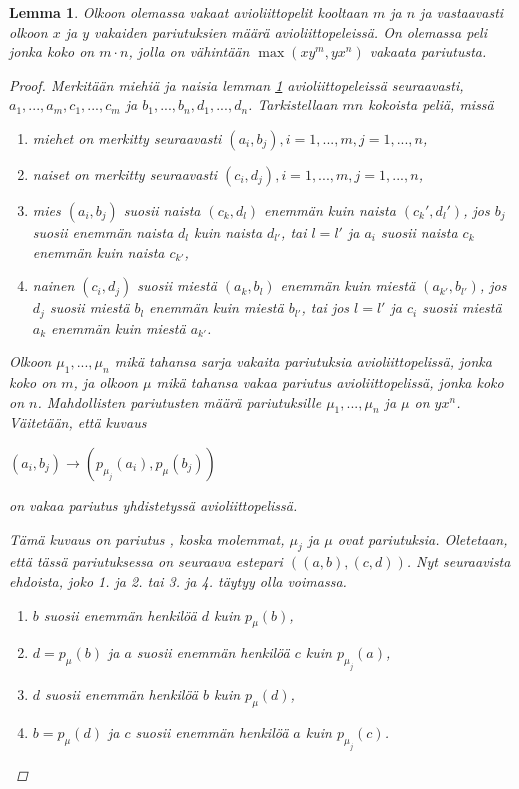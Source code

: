 \documentclass[finnish]{tktltiki2}
\newtheorem{lem}[lau]{Lemma}
\theoremstyle{definition}
\theoremstyle{remark}
\begin{document}
\begin{lem} \cite[s. 23]{gusfield1989stable} \label{lemma-koko}
Olkoon olemassa vakaat avioliittopelit kooltaan $m$ ja $n$ ja vastaavasti olkoon $x$ ja $y$ vakaiden pariutuksien määrä avioliittopeleissä. On olemassa peli jonka koko on $m \cdot n$, jolla on vähintään $\max(xy^m, yx^n)$ vakaata pariutusta.

\begin{proof}\cite[s. 23]{gusfield1989stable}
Merkitään miehiä ja naisia lemman \ref{lemma-koko} avioliittopeleissä seuraavasti, $a_1,...,a_{m}, c_1,...,c_{m}$ ja $b_1,...,b_{n}, d_1,...,d_{n}$. Tarkistellaan $mn$ kokoista peliä, missä
\begin{enumerate}
\item miehet on merkitty seuraavasti $(a_i,b_j), i = 1,...,m, j = 1,...,n$,
\item naiset on merkitty seuraavasti $(c_i,d_j), i = 1,...,m, j = 1,...,n$,
\item mies $(a_i, b_j)$ suosii naista $(c_k, d_l)$ enemmän kuin naista $(c_k',d_l')$, jos $b_j$ suosii enemmän naista $d_l$ kuin naista $d_{l'}$, tai $l = l'$ ja $a_i$ suosii naista $c_k$ enemmän kuin naista $c_{k'}$,
\item nainen $(c_i, d_j)$ suosii miestä $(a_k, b_l)$ enemmän kuin miestä $(a_{k'}, b_{l'})$, jos $d_j$ suosii miestä $b_l$ enemmän kuin miestä $b_{l'}$, tai jos $l = l'$ ja $c_i$ suosii miestä $a_k$ enemmän kuin miestä $a_{k'}$.
\end{enumerate}

Olkoon $\mu_{1},...,\mu_{n}$ mikä tahansa sarja vakaita pariutuksia avioliittopelissä, jonka koko on $m$, ja olkoon $\mu$ mikä tahansa vakaa pariutus avioliittopelissä, jonka koko on $n$. Mahdollisten pariutusten määrä pariutuksille $\mu_{1},...,\mu_{n}$ ja $\mu$ on $yx^n$. Väitetään, että kuvaus

$(a_i, b_j) \longrightarrow (p_{\mu_{j}}(a_i),p_{\mu}(b_j))$

on vakaa pariutus yhdistetyssä avioliittopelissä.

Tämä kuvaus on pariutus , koska molemmat, $\mu_j$ ja $\mu$ ovat pariutuksia. Oletetaan, että tässä pariutuksessa on seuraava estepari $((a,b),(c,d))$. Nyt seuraavista ehdoista, joko 1. ja 2. tai 3. ja 4. täytyy olla voimassa.

\begin{enumerate}
	\item $b$ suosii enemmän henkilöä $d$ kuin $p_\mu(b)$,
	\item $d = p_\mu(b)$ ja $a$ suosii enemmän henkilöä $c$ kuin $p_{\mu_{j}}(a)$,
	\item $d$ suosii enemmän henkilöä $b$ kuin $p_\mu(d)$,
	\item $b = p_\mu(d)$ ja $c$ suosii enemmän henkilöä $a$ kuin $p_{\mu_{j}}(c)$.
\end{enumerate}


\end{proof}
\end{lem}
\end{document}
